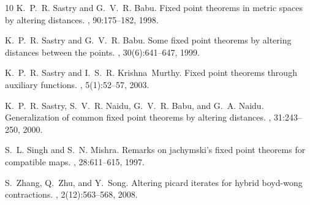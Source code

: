 \documentclass[11]{article}
\numberwithin{equation}{section}
\begin{document}
\begin{thebibliography}{10}
K.~P.~R. Sastry and G.~V.~R. Babu.
\newblock Fixed point theorems in metric spaces by altering distances.
, 90:175--182, 1998.

K.~P.~R. Sastry and G.~V.~R. Babu.
\newblock Some fixed point theorems by altering distances between the points.
, 30(6):641--647, 1999.

K.~P.~R. Sastry and I.~S.~R. Krishna~Murthy.
\newblock Fixed point theorems through auxiliary functions.
, 5(1):52--57, 2003.

K.~P.~R. Sastry, S.~V.~R. Naidu, G.~V.~R. Babu, and G.~A. Naidu.
\newblock Generalization of common fixed point theorems by altering distances.
, 31:243--250, 2000.

S.~L. Singh and S.~N. Mishra.
\newblock Remarks on jachymski's fixed point theorems for compatible maps.
, 28:611--615, 1997.

S.~Zhang, Q.~Zhu, and Y.~Song.
\newblock Altering picard iterates for hybrid boyd-wong contractions.
, 2(12):563--568, 2008.

\end{thebibliography}
\end{document}
